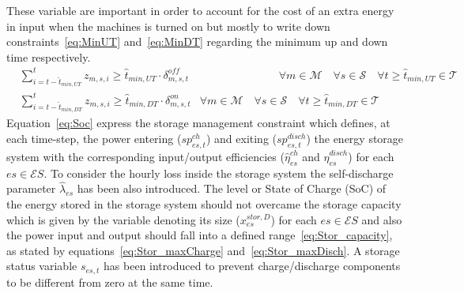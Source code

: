 \documentclass{article}
\newcommand{\cT}{{\mathcal T}}
\newcommand{\cM}{{\mathcal M}}
\newcommand{\cS}{{\mathcal S}}
\newcommand{\cES}{{\mathcal ES}}
\begin{document}
{\begin{comment}
		& \Delta_{m,s,t}^{on} \leq z_{m,s,t} & \hspace{5cm} \forall m \in \cM \quad \forall s \in \cS \quad \forall t \in \cT \label{eq:DeltaOn_3}\\
		& \Delta_{m,s,t}^{off} \geq (z_{m,s,t-1} - z_{m,s,t}) & \hspace{5cm} \forall m \in \cM \quad \forall s \in \cS \quad \forall t \setminus\{1\} \in \cT \label{eq:DeltaOff_1}\\
		& \Delta_{m,s,t}^{off} \leq (1 - z_{m,s,t}) & \hspace{5cm} \forall m \in \cM \quad \forall s \in \cS \quad \forall t \in \cT \label{eq:DeltaOff_2}\\
		& \Delta_{m,s,t}^{off} \leq z_{m,s,t-1} & \hspace{5cm} \forall m \in \cM \quad \forall s \in \cS \quad \forall t \setminus\{1\} \in \cT \label{eq:DeltaOff_3}
		\end{align}
\end{comment}
These variable are important in order to account for the cost of an extra energy in input when the machines is turned on but mostly to write down constraints~\eqref{eq:MinUT} and~\eqref{eq:MinDT} regarding the minimum up and down time respectively.	
		\begin{align}
		& \sum_{ i = t - \hat{t}_{min, UT} }^{t} z_{m,s,i} \geq \hat{t}_{min,UT} \cdot \delta_{m,s,t}^{off} & \hspace{3cm} \forall m \in \cM \quad \forall s \in \cS \quad \forall t \geq \hat{t}_{min, UT} \in \cT \label{eq:MinUT}\\
		& \sum_{ i = t - \hat{t}_{min, DT} }^{t} z_{m,s,i} \geq \hat{t}_{min,DT} \cdot \delta_{m,s,t}^{on} & \forall m \in \cM \quad \forall s \in \cS \quad \forall t \geq \hat{t}_{min, DT} \in \cT \label{eq:MinDT}
		\end{align}
Equation~\eqref{eq:Soc} express the storage management constraint which defines, at each time-step, the power entering ($sp_{es,t}^{ch}$) and exiting ($sp_{es,t}^{disch}$) the energy storage system with the corresponding input/output efficiencies ($\hat{\eta}_{es}^{ch}$ and $\hat{\eta}_{es}^{disch}$) for each $es \in \cES$. To consider the hourly loss inside the storage system the self-discharge parameter $\hat{\lambda}_{es}$ has been also introduced. 
The level or State of Charge (SoC) of the energy stored in the storage system should not overcame the storage capacity which is given by the variable denoting its size ($x_{es}^{stor, D}$) for each $es \in \cES$ and also the power input and output should fall into a defined range~\eqref{eq:Stor_capacity}, as stated by equations~\eqref{eq:Stor_maxCharge} and~\eqref{eq:Stor_maxDisch}. A storage status variable $s_{es,t}$ has been introduced to prevent charge/discharge components to be different from zero at the same time. 
}
\end{document}
